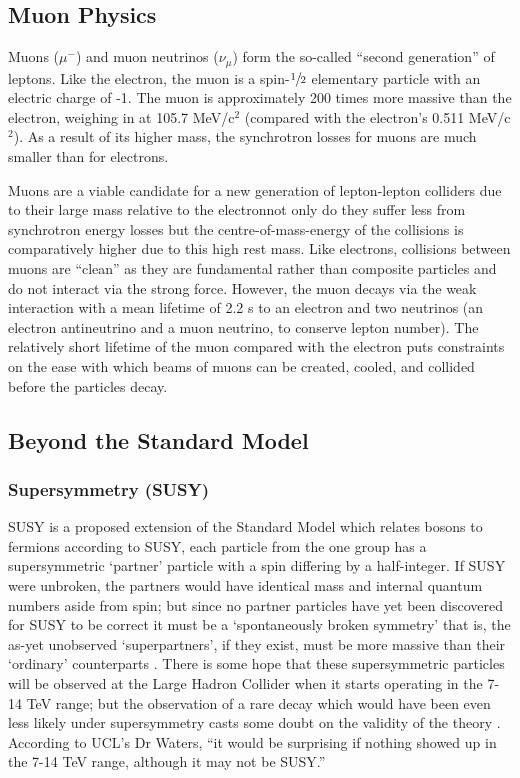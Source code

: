 \subsection{Muon Physics}
Muons ($\mu^{-}$) and muon neutrinos ($\nu_{\mu}$) form the so-called ``second generation'' of leptons. Like the electron, the muon is a spin-$\sfrac{1}{2}$ elementary particle with an electric charge of -1. The muon is approximately 200 times more massive than the electron, weighing in at 105.7 MeV/c$^{2}$ (compared with the electron's 0.511 MeV/c$^{2}$). As a result of its higher mass, the synchrotron losses for muons are much smaller than for electrons.

Muons are a viable candidate for a new generation of lepton-lepton colliders due to their large mass relative to the electron\textendash not only do they suffer less from synchrotron energy losses but the centre-of-mass-energy of the collisions is comparatively higher due to this high rest mass. Like electrons, collisions between muons are ``clean'' as they are fundamental rather than composite particles and do not interact via the strong force. However,  the muon decays via the weak interaction with a mean lifetime of 2.2 \textmu s to an electron and two neutrinos (an electron antineutrino and a muon neutrino, to conserve lepton number). The relatively short lifetime of the muon compared with the electron puts constraints on the ease with which beams of muons can be created, cooled, and collided before the particles decay.

\subsection{Beyond the Standard Model}
\subsubsection{Supersymmetry (SUSY)}
SUSY is a proposed extension of the Standard Model which relates bosons to fermions \textendash  according to SUSY, each particle from the one group has a supersymmetric ‘partner' particle with a spin differing by a half-integer. If SUSY were unbroken, the partners would have identical mass and internal quantum numbers aside from spin; but since no partner particles have yet been discovered for SUSY to be correct it must be a `spontaneously broken symmetry' \textendash that is, the as-yet unobserved `superpartners', if they exist, must be more massive than their `ordinary' counterparts \cite{CERN:Supersymmetry}. There is some hope that these supersymmetric particles will be observed at the Large Hadron Collider when it starts operating in the 7-14 TeV range; but the observation of a rare decay which would have been even less likely under supersymmetry casts some doubt on the validity of the theory \cite{BBC:SUSY}. According to UCL's Dr Waters, ``it would be surprising if nothing showed up in the 7-14 TeV range, although it may not be SUSY.'' \cite{Waters:Interview}

